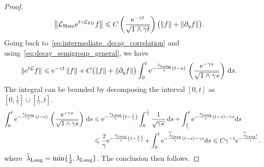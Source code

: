 \documentclass[11pt,a4paper]{article}
\newcommand{\e}{\mathrm{e}}
\renewcommand{\d}{\mathrm d}
\theoremstyle{plain}
\numberwithin{equation}{section}
\renewcommand{\leq}{\leqslant}
\renewcommand{\geq}{\geqslant}
\begin{document}
\begin{proof}
\begin{align}
        \label{eq:bound_action_lham}
        \norm{\mathcal L_{\rm Ham} \e^{t \gamma \mathcal L_{\rm FD}} f}
        &\leq C \left( \frac{\e^{-\gamma t}}{\sqrt{1 \wedge \gamma t}} \right) \bigl( \norm{f} + \norm{\partial_q f} \bigr).
    \end{align}
    Going back to~\eqref{eq:intermediate_decay_correlation} and using~\eqref{eq:decay_semigroup_general},
    we have
    \begin{align*}
        \norm*{ \e^{t \mathcal L} f}
        &\leq  \e^{-\gamma t} \norm{f}
        + C  \bigl( \norm{f} + \norm{\partial_q f}\bigr) \int_{0}^{t} \e^{-\frac{\lambda_{\rm Lang}}{\gamma}(t-s)}  \, \left(\frac{\e^{-\gamma s}}{\sqrt{1 \wedge \gamma s}}\right) \, \d s.
    \end{align*}
    The integral can be bounded by decomposing the interval $[0, t]$ as $[0, \frac{1}{\gamma}] \cup [\frac{1}{\gamma}, t]$.
    \begin{align}
        \notag
        \int_{0}^{t} \e^{-\frac{\lambda_{\rm Lang}}{\gamma}(t-s)}  \, \left( \frac{\e^{-\gamma s}}{\sqrt{1 \wedge \gamma s}} \right) \, \d s
        & \leq
        \e^{-\frac{\lambda_{\rm Lang}}{\gamma} \left(t-\frac{1}{\gamma}\right)}
         \int_{0}^{\frac{1}{\gamma}}  \frac{1}{\sqrt{\gamma s\, }} \, \d s
         + \int_{\frac{1}{\gamma}}^{t} \e^{-\frac{\lambda_{\rm Lang}}{\gamma}(t-s) - \gamma s} \d s \\
         \notag
        & \leq
        \frac{2}{\gamma}\e^{-\frac{\lambda_{\rm Lang}}{\gamma} \left(t-\frac{1}{\gamma}\right)}
         + \int_{0}^{t} \e^{-\frac{\widetilde \lambda_{\rm Lang}}{\gamma}(t-s) - \gamma s} \d s
        \leq C  \gamma^{-1} \e^{-\frac{\widetilde \lambda_{\rm Lang} t}{\gamma}}.
    \end{align}
    where~$\widetilde \lambda_{\rm Lang} = \min \{\frac{1}{2}, \lambda_{\rm Lang} \}$.
    The conclusion then follows.
\end{proof}
\end{document}
